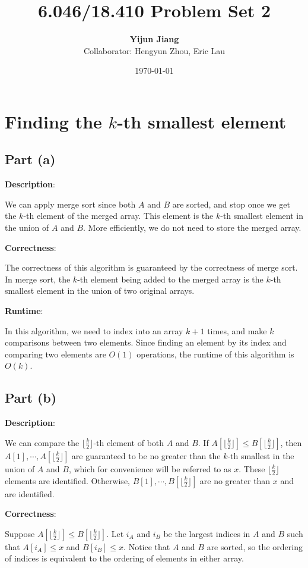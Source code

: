 \documentclass{article}
\title{6.046/18.410 Problem Set 2}
\author{\textbf{Yijun Jiang}\\Collaborator: Hengyun Zhou, Eric Lau}
\date{\today}
\begin{document}
\maketitle

\section{Finding the $k$-th smallest element}
\subsection{Part (a)}
\noindent\textbf{Description}:

We can apply merge sort since both $A$ and $B$ are sorted, and stop once we get the $k$-th element of the merged array. This element is the $k$-th smallest element in the union of $A$ and $B$. More efficiently, we do not need to store the merged array.

\noindent\textbf{Correctness}:

The correctness of this algorithm is guaranteed by the correctness of merge sort. In merge sort, the $k$-th element being added to the merged array is the $k$-th smallest element in the union of two original arrays.

\noindent\textbf{Runtime}:

In this algorithm, we need to index into an array $k+1$ times, and make $k$ comparisons between two elements. Since finding an element by its index and comparing two elements are $O(1)$ operations, the runtime of this algorithm is $O(k)$.

\subsection{Part (b)}
\noindent\textbf{Description}:

We can compare the $\lfloor\frac{k}{2}\rfloor$-th element of both $A$ and $B$. If $A[\lfloor\frac{k}{2}\rfloor]\leqslant B[\lfloor\frac{k}{2}\rfloor]$, then $A[1],\cdots,A[\lfloor\frac{k}{2}\rfloor]$ are guaranteed to be no greater than the $k$-th smallest in the union of $A$ and $B$, which for convenience will be referred to as $x$. These $\lfloor\frac{k}{2}\rfloor$ elements are identified. Otherwise, $B[1],\cdots,B[\lfloor\frac{k}{2}\rfloor]$ are no greater than $x$ and are identified.

\noindent\textbf{Correctness}:

Suppose $A[\lfloor\frac{k}{2}\rfloor]\leqslant B[\lfloor\frac{k}{2}\rfloor]$. Let $i_A$ and $i_B$ be the largest indices in $A$ and $B$ such that $A[i_A]\leqslant x$ and $B[i_B]\leqslant x$. Notice that $A$ and $B$ are sorted, so the ordering of indices is equivalent to the ordering of elements in either array.
\end{document}
